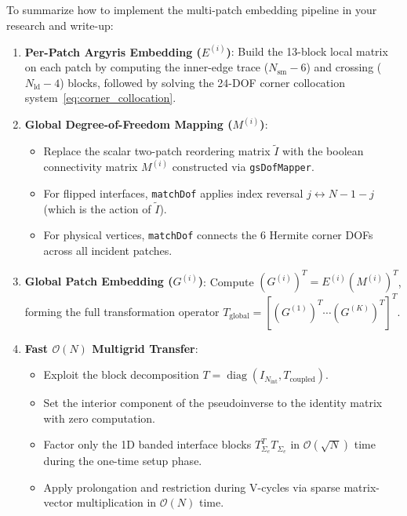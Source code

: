 \documentclass[11pt,a4paper]{article}
\begin{document}
To summarize how to implement the multi-patch embedding pipeline in your research and write-up:
\begin{enumerate}
    \item \textbf{Per-Patch Argyris Embedding ($E^{(i)}$)}: Build the 13-block local matrix on each patch by computing the inner-edge trace ($N_{\text{sm}}-6$) and crossing ($N_{\text{ld}}-4$) blocks, followed by solving the 24-DOF corner collocation system~\eqref{eq:corner_collocation}.
    \item \textbf{Global Degree-of-Freedom Mapping ($M^{(i)}$)}:
    \begin{itemize}
        \item Replace the scalar two-patch reordering matrix $\widetilde{I}$ with the boolean connectivity matrix $M^{(i)}$ constructed via \texttt{gsDofMapper}.
        \item For flipped interfaces, \texttt{matchDof} applies index reversal $j \leftrightarrow N-1-j$ (which is the action of $\widetilde{I}$).
        \item For physical vertices, \texttt{matchDof} connects the 6 Hermite corner DOFs across all incident patches.
    \end{itemize}
    \item \textbf{Global Patch Embedding ($G^{(i)}$)}: Compute $(G^{(i)})^T = E^{(i)} (M^{(i)})^T$, forming the full transformation operator $T_{\text{global}} = [(G^{(1)})^T \cdots (G^{(K)})^T]^T$.
    \item \textbf{Fast $\mathcal{O}(N)$ Multigrid Transfer}:
    \begin{itemize}
        \item Exploit the block decomposition $T = \operatorname{diag}(I_{N_{\text{int}}}, T_{\text{coupled}})$.
        \item Set the interior component of the pseudoinverse to the identity matrix with zero computation.
        \item Factor only the 1D banded interface blocks $T_{\Sigma_e}^T T_{\Sigma_e}$ in $\mathcal{O}(\sqrt{N})$ time during the one-time setup phase.
        \item Apply prolongation and restriction during V-cycles via sparse matrix-vector multiplication in $\mathcal{O}(N)$ time.
    \end{itemize}
\end{enumerate}
\end{document}
